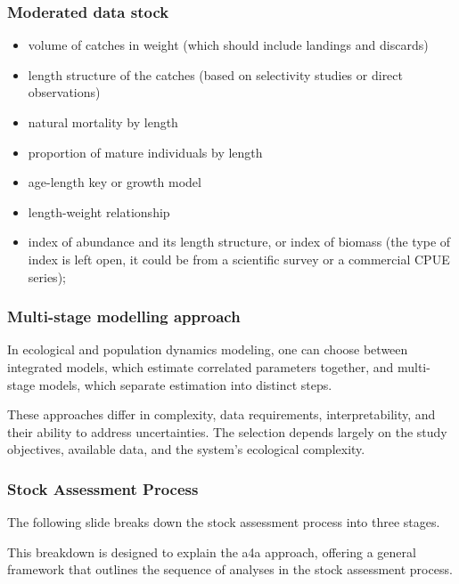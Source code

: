 \documentclass{beamer}
\begin{document}
\begin{frame}
\frametitle{Moderated data stock}

\begin{itemize}
	\item volume of catches in weight (which should include landings and discards)
	\item length structure of the catches (based on selectivity studies or direct observations)
	\item natural mortality by length
	\item proportion of mature individuals by length
	\item age-length key or growth model
	\item length-weight relationship
	\item index of abundance and its length structure, or index of biomass (the type of index is left open, it could be from a scientific survey or a commercial CPUE series);
\end{itemize}

\end{frame}

\begin{frame}
\frametitle{Multi-stage modelling approach}

In ecological and population dynamics modeling, one can choose between integrated models, which estimate correlated parameters together, and multi-stage models, which separate estimation into distinct steps.

\bigskip

These approaches differ in complexity, data requirements, interpretability, and their ability to address uncertainties. The selection depends largely on the study objectives, available data, and the system's ecological complexity.

\end{frame}

\begin{frame}
\frametitle{Stock Assessment Process}

The following slide breaks down the stock assessment process into three stages.

\bigskip

This breakdown is designed to explain the a4a approach, offering a general framework that outlines the sequence of analyses in the stock assessment process.

\end{frame}
\end{document}
